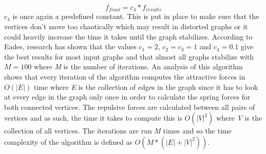 \documentclass[a4paper,12pt,twoside]{article}
\begin{document}
\begin{equation}\label{e:damper}
f_{final} = c_4 * f_{results}
\end{equation}
$c_4$ is once again a predefined constant. This is put in place to make sure that the vertices don't move too chaotically which may result in distorted graphs or it could heavily increase the time it takes until the graph stabilizes.
\newline
According to Eades, research has shown that the values $c_1=2$, $c_2=c_3=1$ and $c_4=0.1$ give the best results for most input graphs and that almost all graphs stabilize with $M=100$ where \emph{M} is the number of iterations.
\newline
An analysis of this algorithm shows that every iteration of the algorithm computes the attractive forces in $O(|E|)$ time where \emph{E} is the collection of edges in the graph since it has to look at every edge in the graph only once in order to calculate the spring forces for both connected vertices. The repulsive forces are calculated between all pairs of vertices and as such, the time it takes to compute this is $O(|V|^2)$ where \emph{V} is the collection of all vertices. The iterations are run \emph{M} times and so the time complexity of the algorithm is defined as $O(M*(|E| + |V|^2))$.
\end{document}
